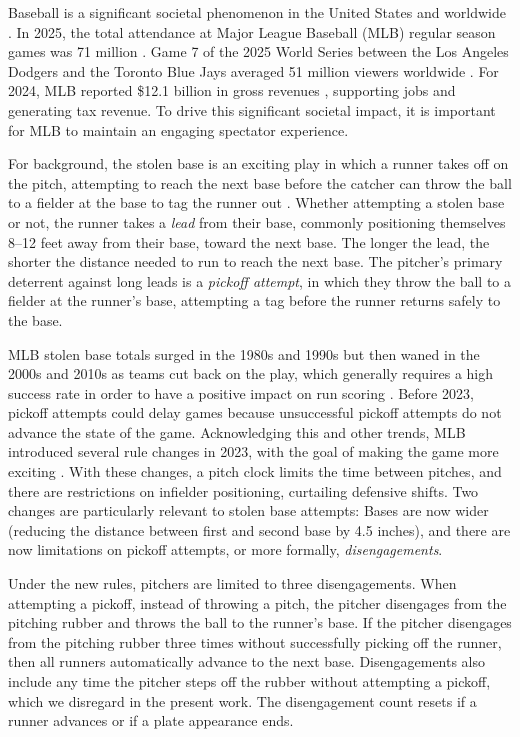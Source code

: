 \documentclass[11pt]{article}
\begin{document}
    Baseball is a significant societal phenomenon in the United States and worldwide \parencite{kelly_is_2007}. In 2025, the total attendance at Major League Baseball (MLB) regular season games was 71 million \parencite{baseball_reference_2025_2025}. Game 7 of the 2025 World Series between the Los Angeles Dodgers and the Toronto Blue Jays averaged 51 million viewers worldwide \parencite{mlb_51_2025}. For 2024, MLB reported \$12.1 billion in gross revenues \parencite{brown_mlb_2025}, supporting jobs and generating tax revenue. To drive this significant societal impact, it is important for MLB to maintain an engaging spectator experience.

    For background, the stolen base is an exciting play in which a runner takes off on the pitch, attempting to reach the next base before the catcher can throw the ball to a fielder at the base to tag the runner out \parencite{mlb_baseball_2025}. Whether attempting a stolen base or not, the runner takes a {\it lead} from their base, commonly positioning themselves 8--12 feet away from their base, toward the next base. The longer the lead, the shorter the distance needed to run to reach the next base. The pitcher's primary deterrent against long leads is a {\it pickoff attempt}, in which they throw the ball to a fielder at the runner's base, attempting a tag before the runner returns safely to the base.

    MLB stolen base totals surged in the 1980s and 1990s but then waned in the 2000s and 2010s as teams cut back on the play, which generally requires a high success rate in order to have a positive impact on run scoring \parencite{tango_book_2007}. Before 2023, pickoff attempts could delay games because unsuccessful pickoff attempts do not advance the state of the game. Acknowledging this and other trends, MLB introduced several rule changes in 2023, with the goal of making the game more exciting \parencite{castrovince_pitch_2023}. With these changes, a pitch clock limits the time between pitches, and there are restrictions on infielder positioning, curtailing defensive shifts. Two changes are particularly relevant to stolen base attempts: Bases are now wider (reducing the distance between first and second base by 4.5 inches), and there are now limitations on pickoff attempts, or more formally, {\it disengagements}.

    Under the new rules, pitchers are limited to three disengagements. When attempting a pickoff, instead of throwing a pitch, the pitcher disengages from the pitching rubber and throws the ball to the runner's base. If the pitcher disengages from the pitching rubber three times without successfully picking off the runner, then all runners automatically advance to the next base. Disengagements also include any time the pitcher steps off the rubber without attempting a pickoff, which we disregard in the present work. The disengagement count resets if a runner advances or if a plate appearance ends.
\end{document}
